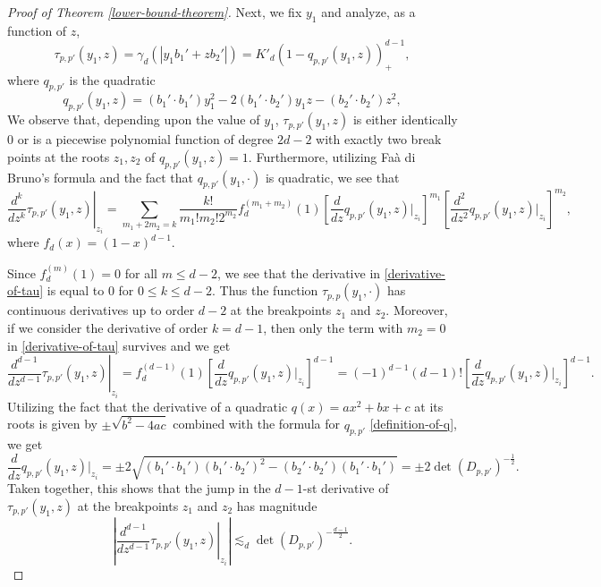 \begin{proof}[Proof of Theorem \ref{lower-bound-theorem}]
 Next, we fix $y_1$ and analyze, as a function of $z$,
 $$\tau_{p,p'}(y_1,z) = \gamma_d(|y_1b_1' + zb_2'|) = K'_d(1-q_{p,p'}(y_1,z))_+^{d-1},$$
 where $q_{p,p'}$ is the quadratic 
 \begin{equation}\label{definition-of-q}
 q_{p,p'}(y_1,z) = (b_1'\cdot b_1')y_1^2-2(b_1'\cdot b_2')y_1z-(b_2'\cdot b_2')z^2,
 \end{equation}
 We observe that, depending upon the value of $y_1$, $\tau_{p,p'}(y_1,z)$ is either identically $0$ or is a piecewise polynomial function of degree $2d-2$ with exactly two break points at the roots $z_1,z_2$ of $q_{p,p'}(y_1,z) = 1$. Furthermore, utilizing Fa\`a di Bruno's formula \cite{di1857note} and the fact that $q_{p,p'}(y_1,\cdot)$ is quadratic, we see that
 \begin{equation}\label{derivative-of-tau}
  \left.\frac{d^k}{dz^k} \tau_{p,p'}(y_1,z)\right|_{z_i} = \sum_{m_1+2m_2=k} \frac{k!}{m_1!m_2!2^{m_2}}f_d^{(m_1+m_2)}(1)\left[\frac{d}{dz}q_{p,p'}(y_1,z)|_{z_i}\right]^{m_1}\left[\frac{d^2}{dz^2}q_{p,p'}(y_1,z)|_{z_i}\right]^{m_2},
 \end{equation}
 where $f_d(x) = (1-x)^{d-1}$. 
 
 Since $f^{(m)}_d(1) = 0$ for all $m \leq d-2$, we see that
 the derivative in \eqref{derivative-of-tau} is equal to $0$ for $0 \leq k\leq d-2$. Thus the function $\tau_{p,p
 }(y_1,\cdot)$ has continuous derivatives up to order $d-2$ at the breakpoints $z_1$ and $z_2$. Moreover, if we consider the derivative of order $k=d-1$, then only the term with $m_2 = 0$ in \eqref{derivative-of-tau} survives and we get
 \begin{equation}
  \left.\frac{d^{d-1}}{dz^{d-1}} \tau_{p,p'}(y_1,z)\right|_{z_i} = f_d^{(d-1)}(1)\left[\frac{d}{dz}q_{p,p'}(y_1,z)|_{z_i}\right]^{d-1} = (-1)^{d-1}(d-1)!\left[\frac{d}{dz}q_{p,p'}(y_1,z)|_{z_i}\right]^{d-1}.
 \end{equation}
 Utilizing the fact that the derivative of a quadratic $q(x) = ax^2 + bx + c$ at its roots is given by $\pm\sqrt{b^2 - 4ac}$ combined with the formula for $q_{p,p'}$ \eqref{definition-of-q}, we get
 \begin{equation}
  \frac{d}{dz}q_{p,p'}(y_1,z)|_{z_i} = \pm 2\sqrt{(b_1'\cdot b_1')(b_1'\cdot b_2')^2-(b_2'\cdot b_2')(b_1'\cdot b_1')} = \pm 2\det(D_{p,p'})^{-\frac{1}{2}}.
 \end{equation}
 Taken together, this shows that the jump in the $d-1$-st derivative of $\tau_{p,p'}(y_1,z)$ at the breakpoints $z_1$ and $z_2$ has magnitude
 \begin{equation}\label{derivative-bound}
 \left|\left.\frac{d^{d-1}}{dz^{d-1}} \tau_{p,p'}(y_1,z)\right|_{z_i}\right| \lesssim_d \det(D_{p,p'})^{-\frac{d-1}{2}}.
 \end{equation}


\end{proof}
